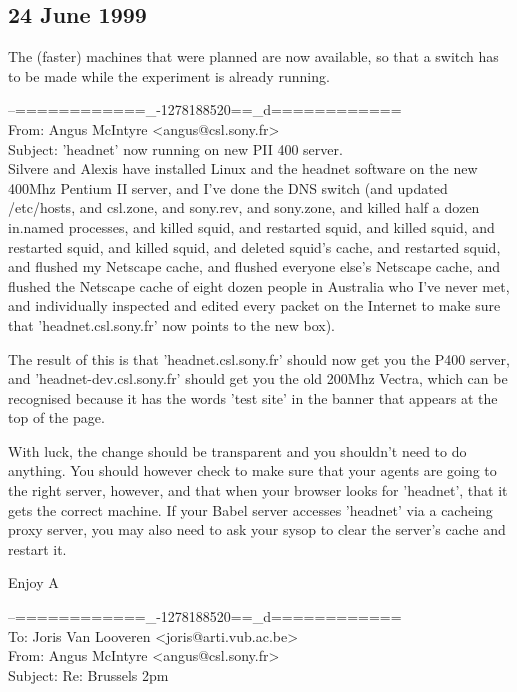 \subsection*{24 June 1999}

The (faster) machines that were planned are now available, so that a switch has to be made while the 
experiment is already running. 
\newline
{
\begin{mail}
--============\_-1278188520==\_d============\\
From: Angus McIntyre <angus@csl.sony.fr>\\
Subject: 'headnet' now running on new PII 400 server.\\

Silvere and Alexis have installed Linux and the headnet software on the 
new 400Mhz Pentium II server, and I've done the DNS switch (and updated
/etc/hosts, and csl.zone, and sony.rev, and sony.zone, and killed half 
a dozen in.named processes, and killed squid, and restarted 
squid, and killed squid, and restarted squid, and killed squid, 
and deleted squid's cache, and restarted squid, and flushed my Netscape
cache, and flushed everyone else's Netscape cache, and flushed the 
Netscape cache of eight dozen people in Australia who I've never 
met, and individually inspected and edited every packet on the 
Internet to make sure that 'headnet.csl.sony.fr' now points to the new box).

The result of this is that 'headnet.csl.sony.fr' should now get 
you the P400 server, and 'headnet-dev.csl.sony.fr' should get you the 
old 200Mhz Vectra, which can be recognised because it has the words 'test 
site' in the banner that appears at the top of the page.

With luck, the change should be transparent and you shouldn't need 
to do anything. You should however check to make sure that your agents 
are going to the right server, however, and that when your browser looks 
for 'headnet', that it gets the correct machine. If your Babel server 
accesses 'headnet' via a cacheing proxy server, you may also need to 
ask your sysop to clear the server's cache and restart it.

Enjoy 
A
\end{mail}
\begin{mail} 
--============\_-1278188520==\_d============\\
To: Joris Van Looveren <joris@arti.vub.ac.be>\\
From: Angus McIntyre <angus@csl.sony.fr>\\
Subject: Re: Brussels 2pm\\


\end{mail}}
